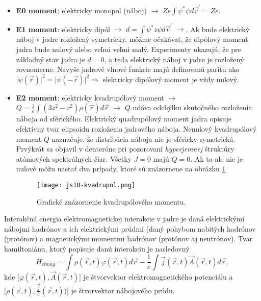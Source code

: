 \documentclass[../../main.tex]{subfiles}
\begin{document}
\begin{itemize}
	\item \textbf{E0 moment}: elektricky monopol (náboj) $\rightarrow$ $Ze\int \psi^{*}\psi d\vec{r}^{\prime}=Ze$.
	\item \textbf{E1 moment}: elektricky dipól $\rightarrow$ $d=\int \psi^{*}z\psi d\vec{r}^{\prime}$ $\rightarrow$. Ak bude elektrický náboj v jadre rozložený symetricky, môžme očakávať, že dipólový moment jadra bude nulový alebo veľmi veľmi malý. Experimenty ukazujú, že pre základný stav jadra je $d=0$, a teda elektrický náboj v jadre je rozložený rovnomerne. Navyše jadrové vlnové funkcie majú definovanú paritu ako $\lvert \psi(\vec{r}) \rvert^2 = \lvert \psi(-\vec{r}) \rvert^2 \Rightarrow$ elektricky dipólový moment je vždy nulový.
	\item \textbf{E2 moment}: elektricky kvadrupólový moment $\rightarrow$ $Q=\frac{1}{e} \int (3z^2-r^2)\rho(\vec{r})d\vec{r}$ $\rightarrow$ $Q$ udáva odchýlku skutočného rozloženia náboja od sférického. Elektrický quadrupólový moment jadra opisuje efektívny tvar elipsoidu rozloženia jadrového náboja. Nenulový kvadrupólový moment $Q$ naznačuje, že distribúcia náboja nie je sféricky symetrická. Prvýkrát sa objavil v deuteróne pri pozorovaní \textit{hyperjemnej} štruktúry atómových spektrálnych čiar. Všetky $J=0$ majú $Q=0$. Ak to ale nie je nulové môžu nastať dva prípady, ktoré sú znázornene na obrázku \ref{js10:kvadr}
	\begin{figure}[!h]
 	\centerline{\texttt{[image: js10-kvadrupol.png]}}
	\caption{Grafické znázornenie kvadrupólového momentu.}
 	\label{js10:kvadr}
	\end{figure}
\end{itemize}

Interakčná energia elektromagnetickej interakcie v jadre je daná elektrickými nábojmi hadrónov a ich elektrickými prúdmi (daný pohybom nabitých hadrónov (protónov) a magnetickými momentmi hadrónov (protónov aj neutrónov). Tvar hamiltoniánu, ktorý popisuje danú interakciu je nasledovný
\begin{equation}
H_{elmag}=\int\rho(\vec{r},t)\varphi(\vec{r},t)d\vec{r}-\frac{1}{c}\int\vec{j}(\vec{r},t)\vec{A}(\vec{r},t)d\vec{r},
\end{equation}
kde $\big[ \varphi(\vec{r},t),\vec{A}(\vec{r},t) \big]$ je štvorvektor elektromagnetického potenciálu a $\big[\rho(\vec{r},t),\frac{\vec{j}}{c}(\vec{r},t)) \big]$ je štvorvektor nábojového prúdu.
\end{document}

